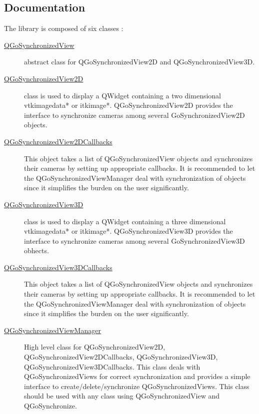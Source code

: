 \documentclass{InsightArticle}
\begin{document}
\subsection*{Documentation}
The library is composed of six classes :
\begin{description}
  \item [\href {http://gofigure2.sourceforge.net/Doxygen/Nightly/html/classQGoSynchronizedView.html}{QGoSynchronizedView}]
    abstract class for QGoSynchronizedView2D and QGoSynchronizedView3D.
    
  \item [\href {http://gofigure2.sourceforge.net/Doxygen/Nightly/html/classQGoSynchronizedView2D.html}{QGoSynchronizedView2D}]
    class is used to display a QWidget containing a two dimensional vtkimagedata* or itkimage*. QGoSynchronizedView2D provides the interface to synchronize cameras among several GoSynchronizedView2D objects.
    
  \item [\href {http://gofigure2.sourceforge.net/Doxygen/Nightly/html/classQGoSynchronizedView2DCallbacks.html}{QGoSynchronizedView2DCallbacks}]
    This object takes a list of QGoSynchronizedView objects and synchronizes their cameras by setting up appropriate callbacks. It is recommended to let the QGoSynchronizedViewManager deal with synchronization of objects since it simplifies the burden on the user significantly.
    
  \item [\href {http://gofigure2.sourceforge.net/Doxygen/Nightly/html/classQGoSynchronizedView3D.html}{QGoSynchronizedView3D}]class is used to display a QWidget containing a three dimensional vtkimagedata* or itkimage*. QGoSynchronizedView3D provides the interface to synchronize cameras among several GoSynchronizedView3D obhects.
  
  \item [\href {http://gofigure2.sourceforge.net/Doxygen/Nightly/html/classQGoSynchronizedView3DCallbacks.html}{QGoSynchronizedView3DCallbacks}]
    This object takes a list of QGoSynchronizedView objects and synchronizes their cameras by setting up appropriate callbacks. It is recommended to let the QGoSynchronizedViewManager deal with synchronization of objects since it simplifies the burden on the user significantly.
  
  \item [\href {http://gofigure2.sourceforge.net/Doxygen/Nightly/html/classQGoSynchronizedViewManager.html}{QGoSynchronizedViewManager}]
  High level class for QGoSynchronizedView2D, QGoSynchronizedView2DCallbacks, QGoSynchronizedView3D, QGoSynchronizedView3DCallbacks. This class deals with QGoSynchronizedViews for correct synchronization and provides a simple interface to create/delete/synchronize QGoSynchronizedViews. This class should be used with any class using QGoSynchronizedView and QGoSynchronize.
  
\end{description}
\end{document}
